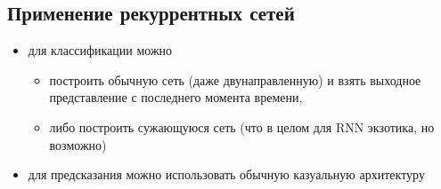 \documentclass[12pt,fleqn]{article}
\begin{document}
\subsection{Применение рекуррентных сетей}

\begin{itemize}
    \item для классификации можно
    \begin{itemize}
        \item построить обычную сеть (даже двунаправленную) и взять выходное представление с последнего момента времени,
        \item либо построить сужающуюся сеть (что в целом для RNN экзотика, но возможно)
    \end{itemize}
    \item для предсказания можно использовать обычную казуальную архитектуру \cite{deepar}

\end{itemize}
\end{document}
